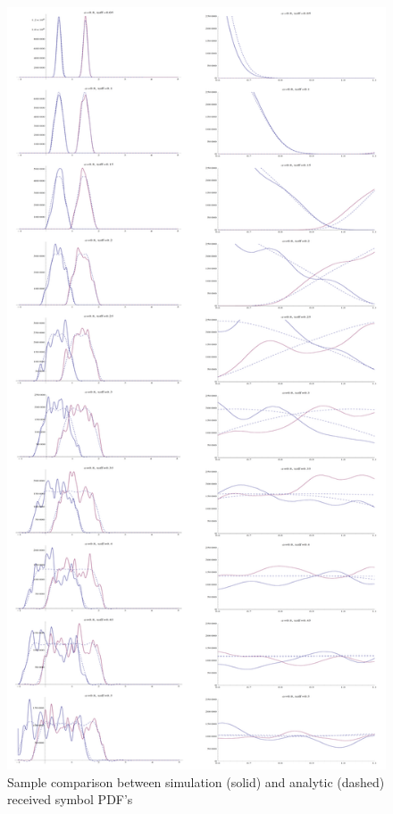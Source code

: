 \begin{figure}[htbp]
\centering
\includegraphics[height=\textheight]{comparison_scaled.png}
\caption{Sample comparison between simulation (solid) and analytic
(dashed) received symbol PDF's}
\end{figure}

